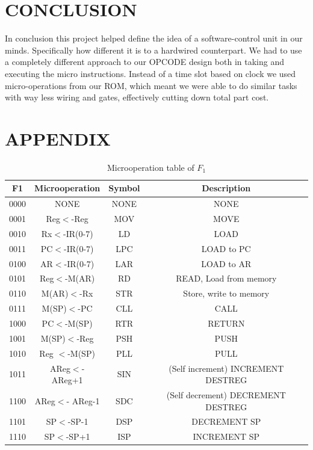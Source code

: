 \documentclass[pdftex,12pt,a4paper]{article}
\begin{document}
\section{CONCLUSION}

In conclusion this project helped define the idea of a software-control unit in our minds. Specifically how different it is to a hardwired counterpart. We had to use a completely different approach to our OPCODE design both in taking and executing the micro instructions. Instead of a time slot based on clock we used micro-operations from our ROM, which meant we were able to do similar tasks with way less wiring and gates, effectively cutting down total part cost. 
\clearpage
\section{APPENDIX}
\begin{table}[h]
    \centering
    \begin{tabular}{|c|c c c|}
    \hline
    F1 & Microoperation  & Symbol & Description \\ \hline
    0000 &    NONE		   &       NONE    &         	NONE      \\
    0001 &    Reg$<$-Reg 	 &     MOV	 &           MOVE    \\
    0010 &    Rx$<$-IR(0-7)	 &     LD	     &       LOAD    \\
    0011 &    PC$<$-IR(0-7)   &    LPC	 &           LOAD to PC        \\
    0100 &    AR$<$-IR(0-7)  &     LAR	     &       LOAD  to AR        \\
    0101 &    Reg$<$-M(AR)     &   RD	   &         READ,  Load from memory	        \\
    0110 &    M(AR)$<$-Rx	   &   STR	    &        Store, write  to memory	        \\
    0111 &    M(SP)$<$-PC	   &   CLL	    &        CALL       \\
    1000 &    PC$<$-M(SP)	   &   RTR	       &     RETURN            \\
    1001 &    M(SP)$<$-Reg	&      PSH	  &          PUSH	            \\
    1010 &    Reg $<$-M(SP)	   &   PLL	         &   PULL	       \\
    1011 &    AReg$<$-AReg+1    &  SIN       &       	(Self increment) INCREMENT DESTREG            \\
    1100 &    AReg$<$- AReg-1   &  SDC	  &          (Self  decrement) DECREMENT DESTREG        \\
    1101 &    SP$<$-SP-1	   &   DSP	 &           DECREMENT SP            \\
    1110 &    SP$<$-SP+1	   &   ISP	 &           INCREMENT SP       \\ \hline
    \end{tabular}
    \caption{Microoperation table of $F_1$}
    \label{mp f1}
\end{table}
\end{document}
